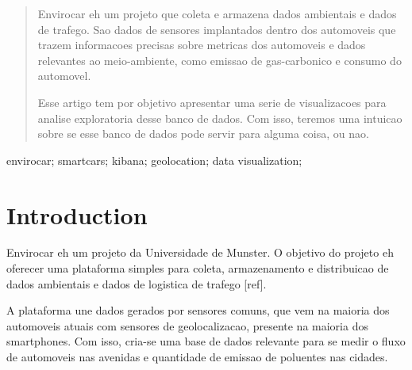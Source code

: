 \documentclass[10pt, conference]{IEEEtran}
\begin{document}
\maketitle


\begin{abstract}
Envirocar eh um projeto que coleta e armazena dados ambientais e dados de trafego. 
Sao dados de sensores implantados dentro dos automoveis que trazem informacoes
precisas sobre metricas dos automoveis e dados relevantes ao meio-ambiente, como
emissao de gas-carbonico e consumo do automovel. 

Esse artigo tem por objetivo apresentar uma serie de 
visualizacoes para analise exploratoria desse banco de dados. Com isso, teremos
uma intuicao sobre se esse banco de dados pode servir para alguma coisa, ou nao.

%
\end{abstract}

\begin{IEEEkeywords}
envirocar; smartcars; kibana; geolocation; data visualization;

\end{IEEEkeywords}


\IEEEpeerreviewmaketitle





\section{Introduction}
Envirocar eh um projeto da Universidade de Munster. O objetivo 
do projeto eh oferecer uma plataforma simples para coleta, 
armazenamento e distribuicao de dados ambientais e dados de logistica
de trafego [ref]. 

A plataforma une dados gerados por sensores comuns,
que vem na maioria dos automoveis atuais com sensores de 
geolocalizacao, presente na maioria dos smartphones. Com isso,
cria-se uma base de dados relevante para se medir o fluxo de automoveis
nas avenidas e quantidade de emissao de poluentes nas cidades. 
\end{document}
